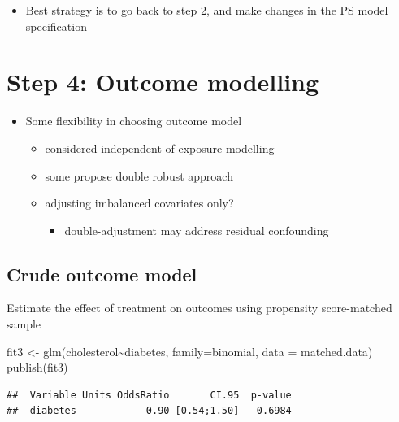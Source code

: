 \documentclass[
]{book}
\newenvironment{Shaded}{\begin{snugshade}}{\end{snugshade}}
\newcommand{\AttributeTok}[1]{\textcolor[rgb]{0.77,0.63,0.00}{#1}}
\newcommand{\FunctionTok}[1]{\textcolor[rgb]{0.00,0.00,0.00}{#1}}
\newcommand{\NormalTok}[1]{#1}
\newcommand{\OtherTok}[1]{\textcolor[rgb]{0.56,0.35,0.01}{#1}}
\newcommand{\SpecialCharTok}[1]{\textcolor[rgb]{0.00,0.00,0.00}{#1}}
\providecommand{\tightlist}{%
  \setlength{\itemsep}{0pt}\setlength{\parskip}{0pt}}
\begin{document}
\begin{itemize}
\tightlist
\item
  Best strategy is to go back to step 2, and make changes in the PS model specification
\end{itemize}

\hypertarget{s4}{%
\chapter{Step 4: Outcome modelling}\label{s4}}

\begin{itemize}
\tightlist
\item
  Some flexibility in choosing outcome model

  \begin{itemize}
  \tightlist
  \item
    considered independent of exposure modelling
  \item
    some propose double robust approach
  \item
    adjusting imbalanced covariates only?

    \begin{itemize}
    \tightlist
    \item
      double-adjustment may address residual confounding \citep{nguyen2017double}
    \end{itemize}
  \end{itemize}
\end{itemize}

\hypertarget{crude-outcome-model}{%
\section{Crude outcome model}\label{crude-outcome-model}}

Estimate the effect of treatment on outcomes using propensity score-matched sample

\begin{Shaded}
\begin{Highlighting}[]
\NormalTok{fit3 }\OtherTok{\textless{}{-}} \FunctionTok{glm}\NormalTok{(cholesterol}\SpecialCharTok{\textasciitilde{}}\NormalTok{diabetes,}
            \AttributeTok{family=}\NormalTok{binomial, }\AttributeTok{data =}\NormalTok{ matched.data)}
\FunctionTok{publish}\NormalTok{(fit3)}
\end{Highlighting}
\end{Shaded}

\begin{verbatim}
##  Variable Units OddsRatio       CI.95  p-value 
##  diabetes            0.90 [0.54;1.50]   0.6984
\end{verbatim}
\end{document}
